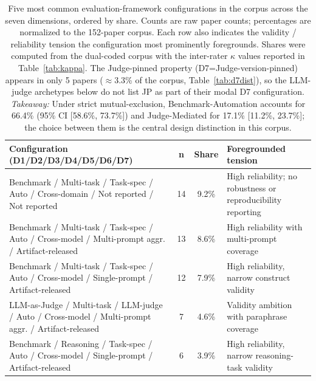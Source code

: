 \documentclass[acmsmall, nonacm, screen]{acmart}
\begin{document}
\begin{table}[!t]
\renewcommand{\arraystretch}{1.2}
\caption{Five most common evaluation-framework configurations in the
corpus across the seven dimensions, ordered by share. Counts are
raw paper counts; percentages are normalized to the 152-paper corpus.
Each row also indicates the validity / reliability tension the
configuration most prominently foregrounds. Shares were computed
from the dual-coded corpus with the inter-rater $\kappa$ values
reported in Table~\ref{tab:kappa}. The Judge-pinned property
(D7=Judge-version-pinned) appears in only 5 papers
($\approx$3.3\% of the corpus, Table~\ref{tab:d7dist}), so the
LLM-judge archetypes below do not list JP as part of their modal
D7 configuration.
\textit{Takeaway:} Under strict mutual-exclusion, Benchmark-Automation accounts for 66.4\% (95\% CI [58.6\%, 73.7\%]) and Judge-Mediated for 17.1\% [11.2\%, 23.7\%]; the choice between them is the central design distinction in this corpus.}
\label{tab:archetype_distribution}
\centering
\footnotesize
\setlength{\tabcolsep}{6pt}
\begin{tabular}{p{7.0cm} c c p{3.5cm}}
\toprule
\textbf{Configuration (D1/D2/D3/D4/D5/D6/D7)} & \textbf{n} & \textbf{Share} & \textbf{Foregrounded tension} \\
\midrule
Benchmark / Multi-task / Task-spec / Auto / Cross-domain / Not reported / Not reported & 14 & 9.2\% & High reliability; no robustness or reproducibility reporting \\
Benchmark / Multi-task / Task-spec / Auto / Cross-model / Multi-prompt aggr. / Artifact-released & 13 & 8.6\% & High reliability with multi-prompt coverage \\
Benchmark / Multi-task / Task-spec / Auto / Cross-model / Single-prompt / Artifact-released & 12 & 7.9\% & High reliability, narrow construct validity \\
LLM-as-Judge / Multi-task / LLM-judge / Auto / Cross-model / Multi-prompt aggr. / Artifact-released & 7 & 4.6\% & Validity ambition with paraphrase coverage \\
Benchmark / Reasoning / Task-spec / Auto / Cross-model / Single-prompt / Artifact-released & 6 & 3.9\% & High reliability, narrow reasoning-task validity \\
\bottomrule
\end{tabular}
\end{table}






\end{document}

